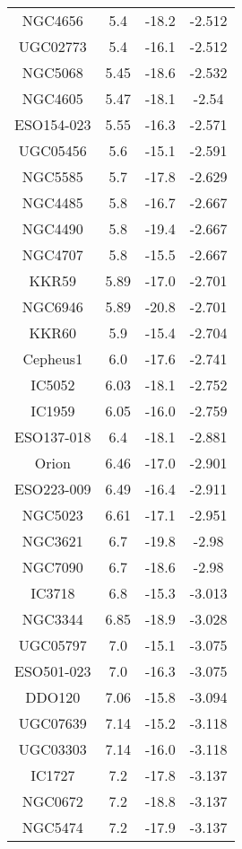 \begin{table}
\begin{tabular}{cccc}
NGC4656 & 5.4 & -18.2 & -2.512 \\
UGC02773 & 5.4 & -16.1 & -2.512 \\
NGC5068 & 5.45 & -18.6 & -2.532 \\
NGC4605 & 5.47 & -18.1 & -2.54 \\
ESO154-023 & 5.55 & -16.3 & -2.571 \\
UGC05456 & 5.6 & -15.1 & -2.591 \\
NGC5585 & 5.7 & -17.8 & -2.629 \\
NGC4485 & 5.8 & -16.7 & -2.667 \\
NGC4490 & 5.8 & -19.4 & -2.667 \\
NGC4707 & 5.8 & -15.5 & -2.667 \\
KKR59 & 5.89 & -17.0 & -2.701 \\
NGC6946 & 5.89 & -20.8 & -2.701 \\
KKR60 & 5.9 & -15.4 & -2.704 \\
Cepheus1 & 6.0 & -17.6 & -2.741 \\
IC5052 & 6.03 & -18.1 & -2.752 \\
IC1959 & 6.05 & -16.0 & -2.759 \\
ESO137-018 & 6.4 & -18.1 & -2.881 \\
Orion & 6.46 & -17.0 & -2.901 \\
ESO223-009 & 6.49 & -16.4 & -2.911 \\
NGC5023 & 6.61 & -17.1 & -2.951 \\
NGC3621 & 6.7 & -19.8 & -2.98 \\
NGC7090 & 6.7 & -18.6 & -2.98 \\
IC3718 & 6.8 & -15.3 & -3.013 \\
NGC3344 & 6.85 & -18.9 & -3.028 \\
UGC05797 & 7.0 & -15.1 & -3.075 \\
ESO501-023 & 7.0 & -16.3 & -3.075 \\
DDO120 & 7.06 & -15.8 & -3.094 \\
UGC07639 & 7.14 & -15.2 & -3.118 \\
UGC03303 & 7.14 & -16.0 & -3.118 \\
IC1727 & 7.2 & -17.8 & -3.137 \\
NGC0672 & 7.2 & -18.8 & -3.137 \\
NGC5474 & 7.2 & -17.9 & -3.137 \\
\end{tabular}
\end{table}
